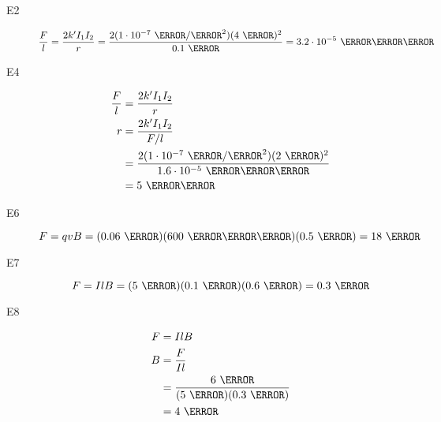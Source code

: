 \documentclass{exam}
\begin{document}
\begin{description}

\item[E2]
\[
   \frac{F}{l} = \frac{2k'I_1I_2}{r} = \frac{2 (1 \cdot 10^{-7} \ \newton/\ampere^2) (4 \ \ampere)^2}{0.1 \ \meter}
     = 3.2 \cdot 10^{-5} \ \newton \per \meter
\]

\item[E4]
\begin{align*}
  \frac{F}{l} &= \frac{2k'I_1I_2}{r} \\ 
    r &= \frac{2k'I_1I_2}{F/l} \\ 
     &= \frac{2 (1 \cdot 10^{-7} \ \newton/\ampere^2) (2 \ \ampere)^2}{1.6 \cdot 10^{-5} \ \newton \per \meter} \\
     &= 5 \ \centi\meter \\
\end{align*}

\item[E6]
\[
  F = qvB = (0.06 \ \coulomb)(600 \ \meter \per \second)(0.5 \ \tesla) = 18 \ \newton
\]

\item[E7]
\[
  F = IlB = (5 \ \ampere)(0.1 \ \meter)(0.6 \ \tesla) = 0.3 \ \newton
\]

\item[E8]
\begin{align*}
  F &= IlB \\
  B &= \frac{F}{Il} \\
    &= \frac{6 \ \newton}{(5 \ \ampere)(0.3 \ \meter)} \\
    &= 4 \ \tesla \\
\end{align*}

\end{description}
\end{document}
